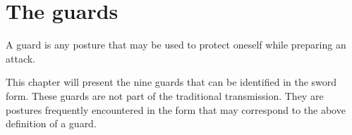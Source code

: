 \chapter{The guards}\label{ch:guards}

A guard is any posture that may be used to protect oneself while preparing an attack.

This chapter will present the nine guards that can be identified in the \Yangjia{} \Michuan{} \Taijijian{} \Kunlun{} sword form.
These guards are not part of the traditional transmission. They are postures frequently encountered in the form that may correspond to the above definition of a guard.